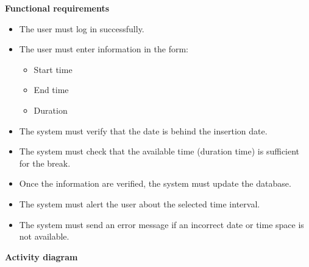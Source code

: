 \documentclass{article}
\begin{document}
	\bigskip
	\noindent
	\textbf{Functional requirements} \\
	\begin{itemize}
		\item The user must log in successfully.
		\item The user must enter information in the form:
			\begin{itemize}
				\item Start time
				\item End time
				\item Duration
			\end{itemize}
		\item The system must verify that the date is behind the insertion date.
		\item The system must check that the available time (duration time) is sufficient for the break.
		\item Once the information are verified, the system must update the database.
		\item The system must alert the user about the selected time interval.
		\item The system must send an error message if an incorrect date or time space is not available.
	\end{itemize}
	
	\newpage
	\noindent
	\textbf{Activity diagram} \\
	
\end{document}
